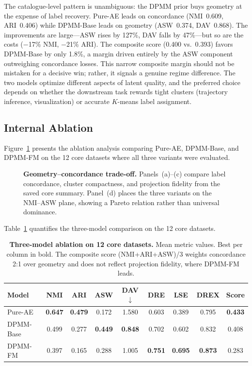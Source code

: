 \documentclass[biology,article,submit,pdftex,moreauthors]{Definitions/mdpi}
\begin{document}
The catalogue-level pattern is unambiguous: the DPMM prior buys geometry at the expense of label recovery. Pure-AE leads on concordance (NMI~0.609, ARI~0.406) while DPMM-Base leads on geometry (ASW~0.374, DAV~0.868). The improvements are large---ASW rises by 127\%, DAV falls by 47\%---but so are the costs ($-$17\% NMI, $-$21\% ARI). The composite score (0.400 vs.\ 0.393) favors DPMM-Base by only 1.8\%, a margin driven entirely by the ASW component outweighing concordance losses. This narrow composite margin should not be mistaken for a decisive win; rather, it signals a genuine regime difference. The two models optimize different aspects of latent quality, and the preferred choice depends on whether the downstream task rewards tight clusters (trajectory inference, visualization) or accurate $K$-means label assignment.

\subsection{Internal Ablation}
Figure~\ref{fig:ablation} presents the ablation analysis comparing Pure-AE, DPMM-Base, and DPMM-FM on the 12 core datasets where all three variants were evaluated.

\begin{figure}[H]
\centering

\caption{\textbf{Geometry--concordance trade-off.} Panels~(a)--(c) compare label concordance, cluster compactness, and projection fidelity from the saved core summary. Panel~(d) places the three variants on the NMI--ASW plane, showing a Pareto relation rather than universal dominance.}
\label{fig:ablation}
\end{figure}

Table~\ref{tab:dpmm_ablation_core} quantifies the three-model comparison on the 12 core datasets.

\begin{table}[H]
\centering
\caption{\textbf{Three-model ablation on 12 core datasets.} Mean metric values. Best per column in bold. The composite score (NMI+ARI+ASW)/3 weights concordance 2:1 over geometry and does not reflect projection fidelity, where DPMM-FM leads.}
\label{tab:dpmm_ablation_core}
{\small
\begin{tabular}{lcccccccc}
\toprule
Model & NMI & ARI & ASW & DAV$\downarrow$ & DRE & LSE & DREX & Score \\
\midrule
Pure-AE   & \textbf{0.647} & \textbf{0.479} & 0.172 & 1.580 & 0.603 & 0.389 & 0.795 & \textbf{0.433} \\
DPMM-Base & 0.499 & 0.277 & \textbf{0.449} & \textbf{0.848} & 0.702 & 0.602 & 0.832 & 0.408 \\
DPMM-FM   & 0.397 & 0.165 & 0.288 & 1.005 & \textbf{0.751} & \textbf{0.695} & \textbf{0.873} & 0.283 \\
\bottomrule
\end{tabular}
}
\end{table}
\end{document}
